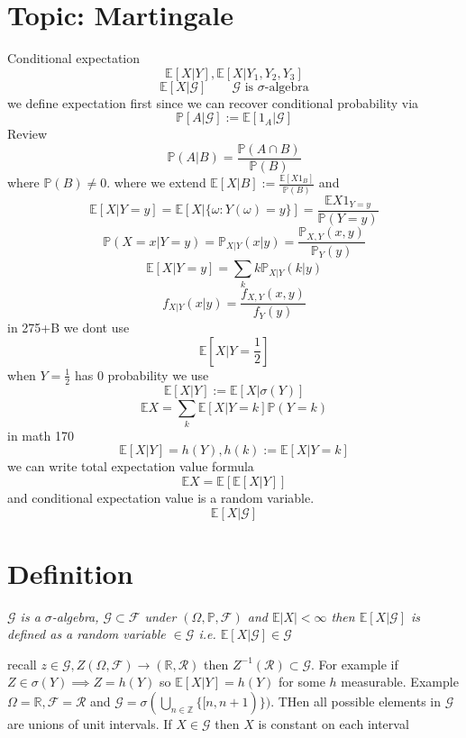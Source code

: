 \documentclass[11pt]{article}
\begin{document}
\section{Topic: Martingale}
Conditional expectation
\[
    \mathbb{E}[X | Y], \mathbb{E}[X| Y_1,Y_2,Y_3] 
\] 
\[
    \mathbb{E}[X | \mathcal{G}] \qquad \mathcal{G} \text{ is $\sigma$-algebra}
\] 
we define expectation first since we can recover conditional probability via
\[
    \mathbb{P}[A | \mathcal{G}] := \mathbb{E}[1_A | \mathcal{G}]
\] 
Review
\[
\mathbb{P}(A |B) = \frac{\mathbb{P}(A \cap B)}{ \mathbb{P}(B)}
\] 
where $ \mathbb{P}(B) \ne 0$.
where we extend $ \mathbb{E}[X | B] := \frac{\mathbb{E}[X 1_{B}]}{ \mathbb{P}(B)}$ 
and
\[
    \mathbb{E}[X | Y = y] = \mathbb{E}[X | \{\omega : Y(\omega) = y\}] = \frac{ \mathbb{E}X 1_{Y=y}}{ \mathbb{P}(Y =y)}
\] 
\[
    \mathbb{P}(X=x|Y=y) = \mathbb{P}_{X|Y}(x|y) = \frac{\mathbb{P}_{X,Y}(x,y)}{ \mathbb{P}_Y(y)}
\] 
\[
    \mathbb{E}[X | Y=y] = \sum_{k}^{} k \mathbb{P}_{X|Y}(k|y)
\] 
\[
    f_{X|Y}(x|y) = \frac{f_{X,Y}(x,y)}{f_Y(y)}
\] 
in 275+B we dont use
\[
    \mathbb{E}[X|Y=\frac{1}{2}]
\] 
when $Y=\frac{1}{2}$ has 0 probability
we use
\[
    \mathbb{E}[X|Y] := \mathbb{E}[X | \sigma(Y)]
\] 
\[
    \mathbb{E}X = \sum_{k}^{} \mathbb{E}[X | Y=k] \mathbb{P}(Y =k)
\] 
in math 170
\[
    \mathbb{E}[X|Y] = h(Y), h(k) := \mathbb{E}[X| Y=k]
\] 
we can write total expectation value formula
\[
    \mathbb{E}X =  \mathbb{E}[\mathbb{E}[X|Y]]
\] 
and conditional expectation value is a random variable.
\[
    \mathbb{E}[X|\mathcal{G}]
\] 

\section{Definition }
\emph{
    $\mathcal{G}$ is a  $\sigma$-algebra,  $\mathcal{G} \subset \mathcal{F}$ under $ (\Omega, \mathbb{P}, \mathcal{F})$ 
    and $ \mathbb{E}|X| < \infty$ then $ \mathbb{E}[X|\mathcal{G}]$ is defined as 
    a random variable $ \in \mathcal{G}$ i.e. $ \mathbb{E}[X|\mathcal{G}] \in \mathcal{G}$
}

recall $z \in \mathcal{G}, Z (\Omega, \mathcal{F}) \rightarrow ( \mathbb{R}, \mathcal{R})$ then $Z^{-1}(\mathcal{R}) \subset \mathcal{G}$.
For example if $Z \in \sigma(Y) \implies Z = h(Y)$ so $ \mathbb{E}[X | Y] = h(Y)$ for some $h$ measurable.
Example $\Omega = \mathbb{R}, \mathcal{F} =\mathcal{R}$ and $\mathcal{G} = \sigma(\bigcup_{n \in \mathbb{Z}} \{[n,n+1)\})$.
THen all possible elements in $\mathcal{G}$ are unions of unit intervals.
If $X \in  \mathcal{G}$ then  $X$ is constant on each interval
\end{document}
